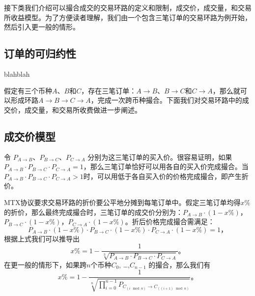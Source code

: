 \documentclass[UTF8,nofonts]{ctexart}
\begin{document}
接下类我们介绍可以撮合成交的交易环路的定义和限制，成交价，成交量，和交易所收益模型。为了方便读者理解，我们由一个包含三笔订单的交易环路为例开始，然后引入更一般的情形。


\subsection{订单的可归约性}

blahblah


假定有三个币种$A$、$B$和$C$，存在三笔订单：$A\rightarrow B$、$B \rightarrow C$和$C \rightarrow A$，那么就可以形成环路$A\rightarrow B \rightarrow C \rightarrow A$，完成一次跨币种撮合。下面我们对交易环路中的成交价，成交量，和交易所收费做进一步阐述。

\subsection{成交价模型\label{sec:pricemodel}}

令 $P_{A \rightarrow B}$、$P_{B \rightarrow C}$、$P_{C \rightarrow A}$ 分别为这三笔订单的买入价。很容易证明，如果$P_{A \rightarrow B}\cdot P_{B \rightarrow C}\cdot P_{C \rightarrow A}=1$，那么三笔订单恰好可以用各自的买入价完成撮合。当$P_{A \rightarrow B}\cdot P_{B \rightarrow C}\cdot P_{C \rightarrow A}>1$时，可以用低于各自买入价的价格完成撮合，即产生折价。






MTX协议要求交易环路的折价要公平地分摊到每笔订单中。假定三笔订单均得$x\%$的折价，那么最终完成撮合时，三笔订单的成交价分别为：$P_{A \rightarrow B}\cdot (1-x\%)$，$P_{B \rightarrow C}\cdot (1-x\%)$，$P_{C \rightarrow A}\cdot (1-x\%)$。折后价格完成撮合需满足：
\begin{equation}\label{match}
P_{A \rightarrow B}\cdot (1-x\%)\cdot P_{B \rightarrow C}\cdot (1-x\%)\cdot P_{C \rightarrow A}\cdot (1-x\%) = 1\text{，}
\end{equation}
根据上式我们可以推导出
\begin{equation*}
x\%= 1- \frac{1}{\sqrt[3]{P_{A \rightarrow B}\cdot P_{B \rightarrow C}\cdot P_{C \rightarrow A}}}\text{。}
\end{equation*}
在更一般的情形下，如果跨$n$个币种$C_{0}$, …,$C_{n-1}$ 的撮合，那么我们有
\begin{equation*}
x\%= 1- \frac{1}{\sqrt[n]{\prod_{i=0}^{n-1} P_{C_{(i\mod n)} \rightarrow C_{((i+1)\mod n)}}}}\text{。}
\end{equation*}
\end{document}
